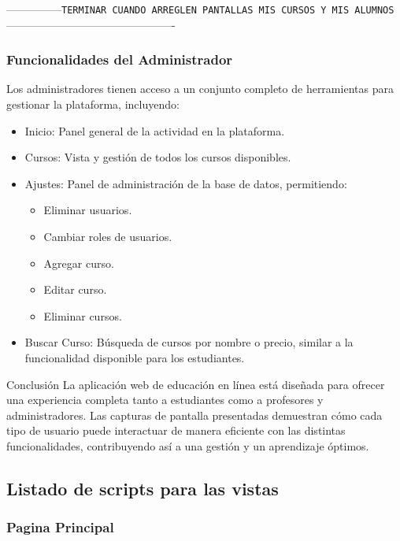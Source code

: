 \documentclass[
]{article}
\providecommand{\tightlist}{%
  \setlength{\itemsep}{0pt}\setlength{\parskip}{0pt}}
\begin{document}
---------------\texttt{TERMINAR\ CUANDO\ ARREGLEN\ PANTALLAS\ MIS\ CURSOS\ Y\ MIS\ ALUMNOS}----------------------------------------------

\subsubsection{Funcionalidades del
Administrador}\label{funcionalidades-del-administrador}

Los administradores tienen acceso a un conjunto completo de herramientas
para gestionar la plataforma, incluyendo:

\begin{itemize}
\tightlist
\item
  Inicio: Panel general de la actividad en la plataforma.
\item
  Cursos: Vista y gestión de todos los cursos disponibles.
\item
  Ajustes: Panel de administración de la base de datos, permitiendo:

  \begin{itemize}
  \tightlist
  \item
    Eliminar usuarios.
  \item
    Cambiar roles de usuarios.
  \item
    Agregar curso.
  \item
    Editar curso.
  \item
    Eliminar cursos.
  \end{itemize}
\item
  Buscar Curso: Búsqueda de cursos por nombre o precio, similar a la
  funcionalidad disponible para los estudiantes.
\end{itemize}

Conclusión La aplicación web de educación en línea está diseñada para
ofrecer una experiencia completa tanto a estudiantes como a profesores y
administradores. Las capturas de pantalla presentadas demuestran cómo
cada tipo de usuario puede interactuar de manera eficiente con las
distintas funcionalidades, contribuyendo así a una gestión y un
aprendizaje óptimos.

\newpage

\subsection{Listado de scripts para las
vistas}\label{listado-de-scripts-para-las-vistas}

\subsubsection{Pagina Principal}\label{pagina-principal}
\end{document}
